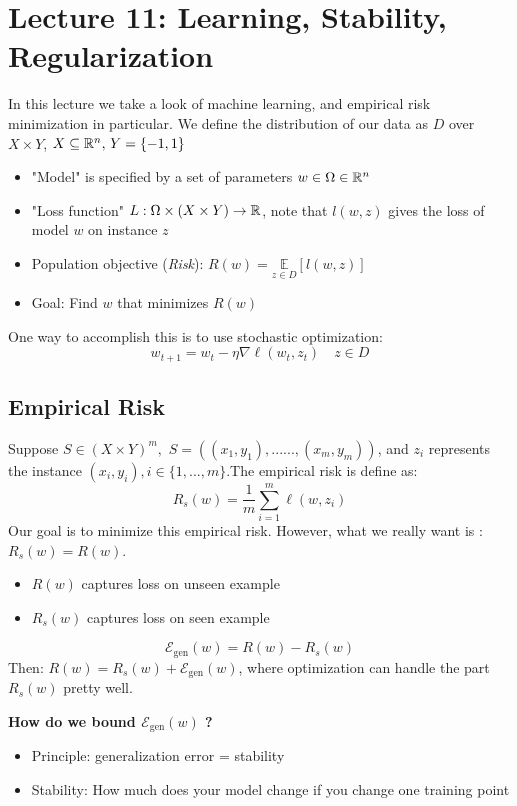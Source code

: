 \section{Lecture 11: Learning, Stability, Regularization
}

In this lecture we take a look of machine learning, and empirical risk minimization in particular. We define the distribution of our data as $D$ over $X\times Y$, $X\subseteq \mathbb{R}^{n}, \,Y = \{ -1,1 \}$
\begin{itemize}
\item "Model" is specified by a set of parameters $w \in \Omega \in \mathbb{R}^{n}$
\item "Loss function" $L: \Omega \times (X\times Y) \rightarrow \mathbb{R}$, note that $l(w,z)$ gives the loss of model $w$ on instance $z$
\item Population objective (\textit{Risk}): $R(w)=\underset{z\in D}{\mathbb{E}}[l(w,z)]$
\item Goal: Find $w$ that minimizes $R(w)$
\end{itemize}

One way to accomplish this is to use stochastic optimization:
$$w_{t+1} = w_{t} - \eta \nabla \ell(w_t,z_t) \quad z\in D $$
\subsection{Empirical Risk}
Suppose $S\in (X \times Y)^{m}, \,\, S=((x_1,y_1),......,(x_m,y_m))$, and $z_i$ represents the instance $(x_i,y_i), i\in \{1, ...,m \}$.The empirical risk is define as:
$$R_{s}(w) = \frac{1}{m}\sum_{i=1}^{m}\ell(w,z_i)$$
Our goal is to minimize this empirical risk. However, what we really want is : $R_{s}(w) = R(w)$.
\begin{itemize}
\item $R(w)$ captures loss on unseen example 
\item $R_s(w)$ captures loss on seen example
\end{itemize}
\begin{definition}
$$\mathcal{E}_{\text{gen}}(w) = R(w) - R_{s}(w)$$
Then: $R(w) = R_{s}(w) + \mathcal{E}_{\text{gen}}(w)$, where optimization can handle the part $R_{s}(w)$ pretty well.
\end{definition}
\textbf{How do we bound $\mathcal{E}_{\text{gen}}(w)$ ?}
\begin{itemize}
\item Principle: generalization error = stability
\item Stability: How much does your model change if you change one training point
\end{itemize}

